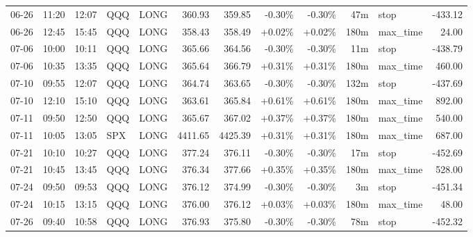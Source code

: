 \documentclass[11pt,a4paper]{article}
\begin{document}
\begin{center}
\begin{longtable}{>{\color{txtmain}}l l l l l r r r r r >{\color{txtmain}}l r}
06-26 & 11:20 & 12:07 & QQQ & LONG & 360.93 & 359.85 & \textcolor{lossred}{-0.30\%} & \textcolor{lossred}{-0.30\%} & 47m & stop & \textcolor{lossred}{-433.12} \\
06-26 & 12:45 & 15:45 & QQQ & LONG & 358.43 & 358.49 & \textcolor{wingreen}{+0.02\%} & \textcolor{wingreen}{+0.02\%} & 180m & max\_time & \textcolor{wingreen}{24.00} \\
07-06 & 10:00 & 10:11 & QQQ & LONG & 365.66 & 364.56 & \textcolor{lossred}{-0.30\%} & \textcolor{lossred}{-0.30\%} & 11m & stop & \textcolor{lossred}{-438.79} \\
07-06 & 10:35 & 13:35 & QQQ & LONG & 365.64 & 366.79 & \textcolor{wingreen}{+0.31\%} & \textcolor{wingreen}{+0.31\%} & 180m & max\_time & \textcolor{wingreen}{460.00} \\
07-10 & 09:55 & 12:07 & QQQ & LONG & 364.74 & 363.65 & \textcolor{lossred}{-0.30\%} & \textcolor{lossred}{-0.30\%} & 132m & stop & \textcolor{lossred}{-437.69} \\
07-10 & 12:10 & 15:10 & QQQ & LONG & 363.61 & 365.84 & \textcolor{wingreen}{+0.61\%} & \textcolor{wingreen}{+0.61\%} & 180m & max\_time & \textcolor{wingreen}{892.00} \\
07-11 & 09:50 & 12:50 & QQQ & LONG & 365.67 & 367.02 & \textcolor{wingreen}{+0.37\%} & \textcolor{wingreen}{+0.37\%} & 180m & max\_time & \textcolor{wingreen}{540.00} \\
07-11 & 10:05 & 13:05 & SPX & LONG & 4411.65 & 4425.39 & \textcolor{wingreen}{+0.31\%} & \textcolor{wingreen}{+0.31\%} & 180m & max\_time & \textcolor{wingreen}{687.00} \\
07-21 & 10:10 & 10:27 & QQQ & LONG & 377.24 & 376.11 & \textcolor{lossred}{-0.30\%} & \textcolor{lossred}{-0.30\%} & 17m & stop & \textcolor{lossred}{-452.69} \\
07-21 & 10:45 & 13:45 & QQQ & LONG & 376.34 & 377.66 & \textcolor{wingreen}{+0.35\%} & \textcolor{wingreen}{+0.35\%} & 180m & max\_time & \textcolor{wingreen}{528.00} \\
07-24 & 09:50 & 09:53 & QQQ & LONG & 376.12 & 374.99 & \textcolor{lossred}{-0.30\%} & \textcolor{lossred}{-0.30\%} & 3m & stop & \textcolor{lossred}{-451.34} \\
07-24 & 10:15 & 13:15 & QQQ & LONG & 376.00 & 376.12 & \textcolor{wingreen}{+0.03\%} & \textcolor{wingreen}{+0.03\%} & 180m & max\_time & \textcolor{wingreen}{48.00} \\
07-26 & 09:40 & 10:58 & QQQ & LONG & 376.93 & 375.80 & \textcolor{lossred}{-0.30\%} & \textcolor{lossred}{-0.30\%} & 78m & stop & \textcolor{lossred}{-452.32} \\

\end{longtable}
\end{center}
\end{document}
